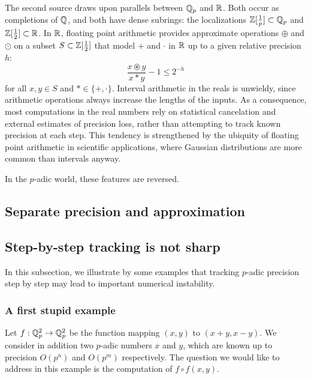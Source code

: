 \documentclass{lms}
\begin{document}
The second source draws upon parallels between $\mathbb Q_p$ and $\mathbb R$.  Both
occur as completions of $\mathbb Q$, and both have dense subrings:
the localizations $\mathbb Z[\frac1p] \subset \mathbb Q_p$ and $\mathbb Z[\frac12] \subset \mathbb R$.
In $\mathbb R$, floating point arithmetic provides approximate operations $\oplus$ and $\odot$ on a
subset $S \subset \mathbb Z[\frac12]$ that model $+$ and $\cdot$ in $\mathbb R$ up to a given relative precision $h$:
\[
\frac{x \circledast y}{x \ast y} - 1 \le 2^{-h}
\]
for all $x, y \in S$ and $\ast \in \{+, \cdot\}$.  Interval arithmetic in the reals
is unwieldy, since arithmetic operations always increase the lengths of the inputs.
As a consequence, most computations in the real numbers rely on
statistical cancelation and external estimates of precision loss, rather than
attempting to track known precision at each step.  This tendency is strengthened
by the ubiquity of floating point arithmetic in scientific applications, where Gaussian
distributions are more common than intervals anyway.

In the $p$-adic world, these features are reversed.


\subsection{Separate precision and approximation}


\subsection{Step-by-step tracking is not sharp}
\label{ssec:stepbystep}

In this subsection, we illustrate by some examples that tracking
$p$-adic precision step by step may lead to important numerical
instability.

\subsubsection*{A first stupid example}

Let $f : \mathbb Q_p^2 \to \mathbb Q_p^2$ be the function mapping $(x,y)$ to $(x+y, 
x-y)$. We consider in addition two $p$-adic numbers $x$ and $y$, 
which are known up to precision $O(p^n)$ and $O(p^m)$ respectively.
The question we would like to address in this example is the
computation of $f \circ f(x,y)$.
\end{document}
